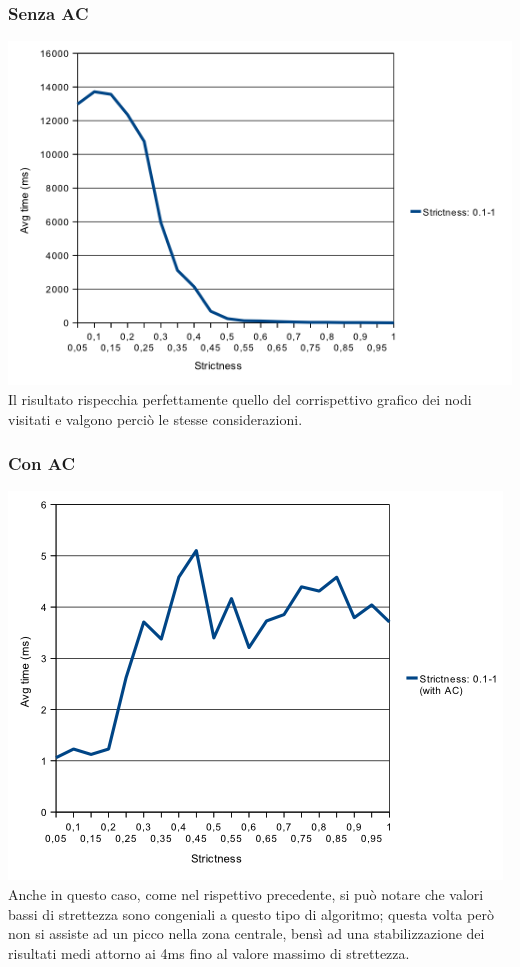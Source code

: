 \documentclass[a4paper,12pt,italian]{article}
\begin{document}
\subsubsection{Senza AC}
\includegraphics[scale=0.8]{strictTime.png}
\\
Il risultato rispecchia perfettamente quello del corrispettivo grafico dei nodi visitati e
valgono perci\`o le stesse considerazioni.

\subsubsection{Con AC}
\includegraphics[scale=0.8]{strictACTime.png}
\\
Anche in questo caso, come nel rispettivo precedente, si pu\`o notare che valori bassi
di strettezza sono congeniali a questo tipo di algoritmo; questa volta per\`o non si assiste ad
un picco nella zona centrale, bens\`i ad una stabilizzazione dei risultati medi attorno ai 4ms fino
al valore massimo di strettezza.
\end{document}
